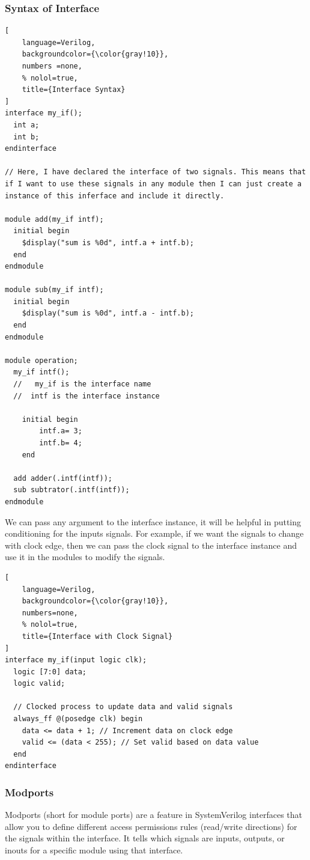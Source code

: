 \documentclass[12pt, a4paper]{article}
\begin{document}
\subsubsection{Syntax of Interface}
\begin{lstlisting}[
    language=Verilog,
    backgroundcolor={\color{gray!10}},
    numbers =none,
    % nolol=true,
    title={Interface Syntax}
]
interface my_if();
  int a;
  int b;
endinterface

// Here, I have declared the interface of two signals. This means that if I want to use these signals in any module then I can just create a instance of this inferface and include it directly.

module add(my_if intf);
  initial begin
    $display("sum is %0d", intf.a + intf.b);
  end
endmodule

module sub(my_if intf);
  initial begin
    $display("sum is %0d", intf.a - intf.b);
  end
endmodule

module operation;
  my_if intf();
  //   my_if is the interface name
  //  intf is the interface instance
  
    initial begin
        intf.a= 3;
 	 	intf.b= 4;
    end

  add adder(.intf(intf));
  sub subtrator(.intf(intf));
endmodule
\end{lstlisting}

We can pass any argument to the interface instance, it will be helpful in putting conditioning for the inputs signals. For example, if we want the signals to change with clock edge, then we can pass the clock signal to the interface instance and use it in the modules to modify the signals.
\begin{lstlisting}[
    language=Verilog,
    backgroundcolor={\color{gray!10}},
    numbers=none,
    % nolol=true,
    title={Interface with Clock Signal}
]
interface my_if(input logic clk);
  logic [7:0] data;
  logic valid;

  // Clocked process to update data and valid signals
  always_ff @(posedge clk) begin
    data <= data + 1; // Increment data on clock edge
    valid <= (data < 255); // Set valid based on data value
  end
endinterface

\end{lstlisting}

\subsubsection{Modports}

Modports (short for module ports) are a feature in SystemVerilog interfaces that allow you to define different access permissions rules (read/write directions) for the signals within the interface. It tells which signals are inputs, outputs, or inouts for a specific module using that interface.
\end{document}
